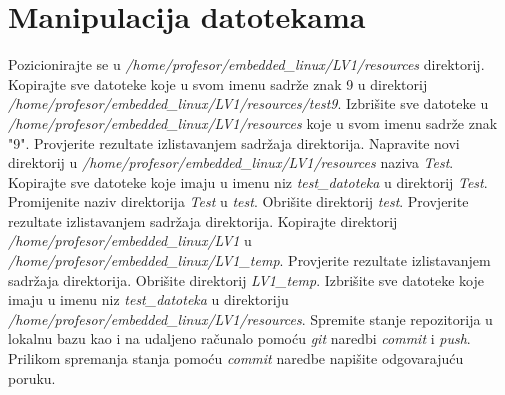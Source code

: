 \documentclass[11pt]{article}
\begin{document}
 \section{Manipulacija datotekama}
 Pozicionirajte se u \textit{/home/profesor/embedded\_linux/LV1/resources}
 direktorij. Kopirajte sve datoteke koje u svom imenu sadrže znak 9 u
 direktorij \\ \textit{/home/profesor/embedded\_linux/LV1/resources/test9}.
 Izbrišite sve datoteke u \textit{/home/profesor/embedded\_linux/LV1/resources}
 koje u svom imenu sadrže znak "9". Provjerite rezultate izlistavanjem sadržaja
 direktorija.
\newline
\newline
Napravite novi direktorij u \textit{/home/profesor/embedded\_linux/LV1/resources}
 naziva \textit{Test}. Kopirajte sve datoteke koje imaju u imenu niz
 \textit{test\_datoteka} u direktorij \textit{Test}. Promijenite naziv
 direktorija \textit{Test} u \textit{test}. Obrišite direktorij \textit{test}.
 Provjerite rezultate izlistavanjem sadržaja direktorija.
 \newline
 \newline
Kopirajte direktorij \textit{/home/profesor/embedded\_linux/LV1} u \\
 \textit{/home/profesor/embedded\_linux/LV1\_temp}. Provjerite rezultate
 izlistavanjem sadržaja direktorija. Obrišite direktorij \textit{LV1\_temp}.
\newline
\newline
Izbrišite sve datoteke koje imaju u imenu niz \textit{test\_datoteka} u
 direktoriju \textit{/home/profesor/embedded\_linux/LV1/resources}.
\newline
\newline
Spremite stanje repozitorija u lokalnu bazu kao i na udaljeno računalo pomoću
 \textit{git} naredbi \textit{commit} i \textit{push}. Prilikom spremanja
 stanja pomoću \textit{commit} naredbe napišite odgovarajuću poruku.
\end{document}
